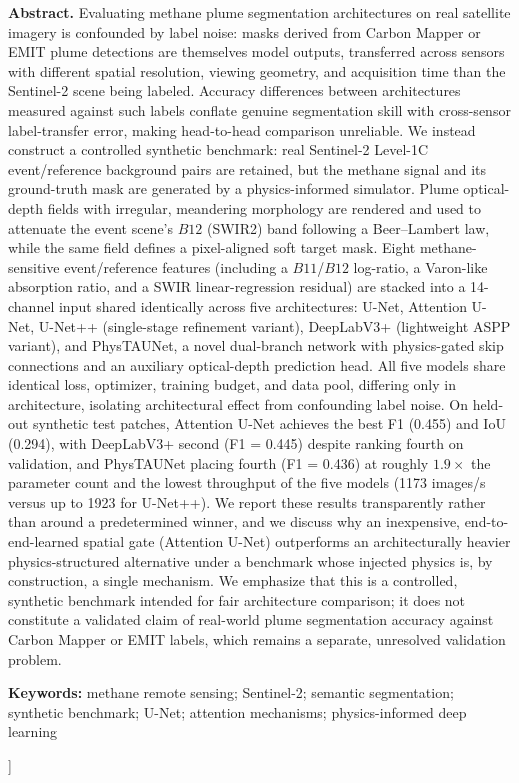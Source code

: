 \documentclass[10pt,twocolumn]{article}
\begin{document}
\begin{center}
\begin{minipage}{0.94\textwidth}
\textbf{Abstract.} Evaluating methane plume segmentation architectures on real satellite imagery is confounded by label noise: masks derived from Carbon Mapper or EMIT plume detections are themselves model outputs, transferred across sensors with different spatial resolution, viewing geometry, and acquisition time than the Sentinel-2 scene being labeled. Accuracy differences between architectures measured against such labels conflate genuine segmentation skill with cross-sensor label-transfer error, making head-to-head comparison unreliable. We instead construct a controlled synthetic benchmark: real Sentinel-2 Level-1C event/reference background pairs are retained, but the methane signal and its ground-truth mask are generated by a physics-informed simulator. Plume optical-depth fields with irregular, meandering morphology are rendered and used to attenuate the event scene's $B12$ (SWIR2) band following a Beer--Lambert law, while the same field defines a pixel-aligned soft target mask. Eight methane-sensitive event/reference features (including a $B11$/$B12$ log-ratio, a Varon-like absorption ratio, and a SWIR linear-regression residual) are stacked into a 14-channel input shared identically across five architectures: U-Net, Attention U-Net, U-Net++ (single-stage refinement variant), DeepLabV3+ (lightweight ASPP variant), and PhysTAUNet, a novel dual-branch network with physics-gated skip connections and an auxiliary optical-depth prediction head. All five models share identical loss, optimizer, training budget, and data pool, differing only in architecture, isolating architectural effect from confounding label noise. On held-out synthetic test patches, Attention U-Net achieves the best F1 (0.455) and IoU (0.294), with DeepLabV3+ second (F1 = 0.445) despite ranking fourth on validation, and PhysTAUNet placing fourth (F1 = 0.436) at roughly $1.9\times$ the parameter count and the lowest throughput of the five models (1173 images/s versus up to 1923 for U-Net++). We report these results transparently rather than around a predetermined winner, and we discuss why an inexpensive, end-to-end-learned spatial gate (Attention U-Net) outperforms an architecturally heavier physics-structured alternative under a benchmark whose injected physics is, by construction, a single mechanism. We emphasize that this is a controlled, synthetic benchmark intended for fair architecture comparison; it does not constitute a validated claim of real-world plume segmentation accuracy against Carbon Mapper or EMIT labels, which remains a separate, unresolved validation problem.

\vspace{4pt}
\textbf{Keywords:} methane remote sensing; Sentinel-2; semantic segmentation; synthetic benchmark; U-Net; attention mechanisms; physics-informed deep learning
\end{minipage}
\end{center}
\vspace{8pt}
]
\end{document}

